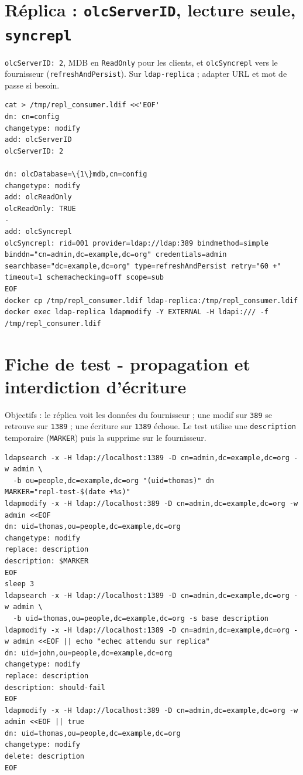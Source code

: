 \documentclass[11pt,a4paper]{report}
\begin{document}
\section{Réplica : \texttt{olcServerID}, lecture seule, \texttt{syncrepl}}

\texttt{olcServerID: 2}, MDB en \texttt{ReadOnly} pour les clients, et \texttt{olcSyncrepl} vers le fournisseur (\texttt{refreshAndPersist}). Sur \texttt{ldap-replica} ; adapter URL et mot de passe si besoin.

\begin{lstlisting}[style=bashstyle]
cat > /tmp/repl_consumer.ldif <<'EOF'
dn: cn=config
changetype: modify
add: olcServerID
olcServerID: 2

dn: olcDatabase=\{1\}mdb,cn=config
changetype: modify
add: olcReadOnly
olcReadOnly: TRUE
-
add: olcSyncrepl
olcSyncrepl: rid=001 provider=ldap://ldap:389 bindmethod=simple binddn="cn=admin,dc=example,dc=org" credentials=admin searchbase="dc=example,dc=org" type=refreshAndPersist retry="60 +" timeout=1 schemachecking=off scope=sub
EOF
docker cp /tmp/repl_consumer.ldif ldap-replica:/tmp/repl_consumer.ldif
docker exec ldap-replica ldapmodify -Y EXTERNAL -H ldapi:/// -f /tmp/repl_consumer.ldif
\end{lstlisting}

\section{Fiche de test - propagation et interdiction d'écriture}

Objectifs : le réplica voit les données du fournisseur ; une modif sur \texttt{389} se retrouve sur \texttt{1389} ; une écriture sur \texttt{1389} échoue. Le test utilise une \texttt{description} temporaire (\texttt{MARKER}) puis la supprime sur le fournisseur.

\begin{verbatim}
ldapsearch -x -H ldap://localhost:1389 -D cn=admin,dc=example,dc=org -w admin \
  -b ou=people,dc=example,dc=org "(uid=thomas)" dn
MARKER="repl-test-$(date +%s)"
ldapmodify -x -H ldap://localhost:389 -D cn=admin,dc=example,dc=org -w admin <<EOF
dn: uid=thomas,ou=people,dc=example,dc=org
changetype: modify
replace: description
description: $MARKER
EOF
sleep 3
ldapsearch -x -H ldap://localhost:1389 -D cn=admin,dc=example,dc=org -w admin \
  -b uid=thomas,ou=people,dc=example,dc=org -s base description
ldapmodify -x -H ldap://localhost:1389 -D cn=admin,dc=example,dc=org -w admin <<EOF || echo "echec attendu sur replica"
dn: uid=john,ou=people,dc=example,dc=org
changetype: modify
replace: description
description: should-fail
EOF
ldapmodify -x -H ldap://localhost:389 -D cn=admin,dc=example,dc=org -w admin <<EOF || true
dn: uid=thomas,ou=people,dc=example,dc=org
changetype: modify
delete: description
EOF
\end{verbatim}
\end{document}
